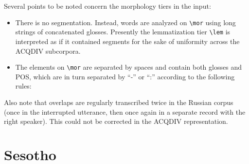 \documentclass[a4paper, 11pt]{book}
\newcommand{\bks}{\textbackslash}	%
\begin{document}
Several points to be noted concern the morphology tiers in the input: 

\begin{itemize}
	\item There is no segmentation. Instead, words are analyzed on \texttt{\bks mor} using long strings of concatenated glosses. 
		Presently the lemmatization tier \texttt{\bks lem} is interpreted as if it contained segments for the sake of uniformity across
		the ACQDIV subcorpora. 
	\item The elements on \texttt{\bks mor} are separated by spaces and contain both glosses and POS, which are in turn separated by “-” or “:” 
		according to the following rules:
\end{itemize}

Also note that overlaps are regularly transcribed twice in the Russian corpus (once in the interrupted utterance, then once again in a separate record with the
right speaker). This could not be corrected in the ACQDIV representation. %

%


\section{Sesotho}
\label{sec:Sesotho}
\end{document}
